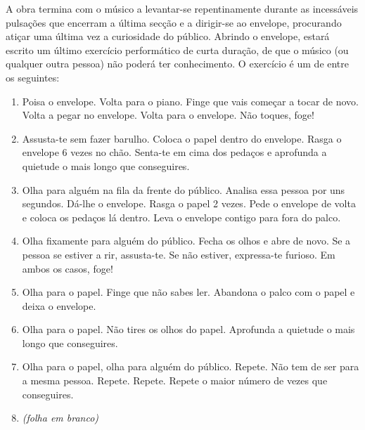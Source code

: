 \documentclass[../main.tex]{subfiles}
\begin{document}
A obra termina com o músico a levantar-se repentinamente durante as incessáveis pulsações que encerram a última secção e a dirigir-se ao envelope, procurando atiçar uma última vez a curiosidade do público. Abrindo o envelope, estará escrito um último exercício performático de curta duração, de que o músico (ou qualquer outra pessoa) não poderá ter conhecimento. O exercício é um de entre os seguintes:
\begin{enumerate}
    \item Poisa o envelope. Volta para o piano. Finge que vais começar a tocar de novo. Volta a pegar no envelope. Volta para o envelope. Não toques, foge!
    \item Assusta-te sem fazer barulho. Coloca o papel dentro do envelope. Rasga o envelope 6 vezes no chão. Senta-te em cima dos pedaços e aprofunda a quietude o mais longo que conseguires.
    \item Olha para alguém na fila da frente do público. Analisa essa pessoa por uns segundos. Dá-lhe o envelope. Rasga o papel 2 vezes. Pede o envelope de volta e coloca os pedaços lá dentro. Leva o envelope contigo para fora do palco.
    \item Olha fixamente para alguém do público. Fecha os olhos e abre de novo. Se a pessoa se estiver a rir, assusta-te. Se não estiver, expressa-te furioso. Em ambos os casos, foge!
    \item Olha para o papel. Finge que não sabes ler. Abandona o palco com o papel e deixa o envelope.
    \item Olha para o papel. Não tires os olhos do papel. Aprofunda a quietude o mais longo que conseguires.
    \item Olha para o papel, olha para alguém do público. Repete. Não tem de ser para a mesma pessoa. Repete. Repete. Repete o maior número de vezes que conseguires.
    \item \textsl{(folha em branco)}
\end{enumerate}
\end{document}
